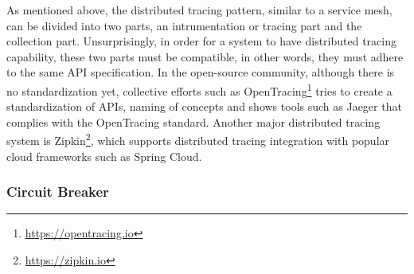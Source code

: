 \documentclass{Configuration_Files/PoliMi3i_thesis}
\begin{document}
As mentioned above, the distributed tracing pattern, similar to a service mesh, can be divided into two parts, an intrumentation or tracing part and the collection part.
Unsurprisingly, in order for a system to have distributed tracing capability, these two parts must be compatible, in other words, they must adhere to the same API specification.
In the open-source community, although there is no standardization yet, collective efforts such as OpenTracing\footnote{\href{https://opentracing.io}{https://opentracing.io}} tries to create a standardization of APIs, naming of concepts and shows tools such as Jaeger that complies with the OpenTracing standard.
Another major distributed tracing system is Zipkin\footnote{\href{https://zipkin.io}{https://zipkin.io}}, which supports distributed tracing integration with popular cloud frameworks such as Spring Cloud.

\subsubsection{Circuit Breaker}
\label{subsubsec:circuit_breaker}
\end{document}
